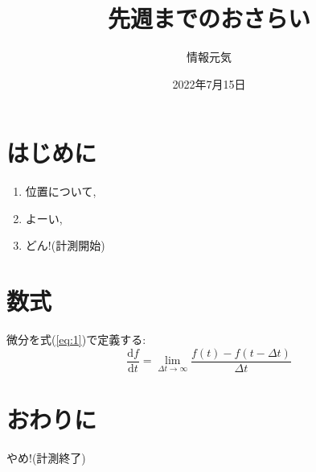 \documentclass[a4j,dvipdfmx]{jsarticle}
\begin{document}
\title{先週までのおさらい}
\author{情報\quad 元気}
\date{2022年7月15日}
\maketitle

\section{はじめに}
\begin{enumerate}
\item 位置について,
\item よーい,
\item どん!\quad (計測開始)
\end{enumerate}
\section{数式}
微分を式(\ref{eq:1})で定義する:
\begin{equation}
\frac{\mathrm{d}f}{\mathrm{d}t}=\lim_{\Delta t\rightarrow\infty}\frac{f(t)-f(t-\Delta t)}{\Delta t}\label{eq:1} 
\end{equation}
\section{おわりに}
やめ!\quad (計測終了)
\end{document}
